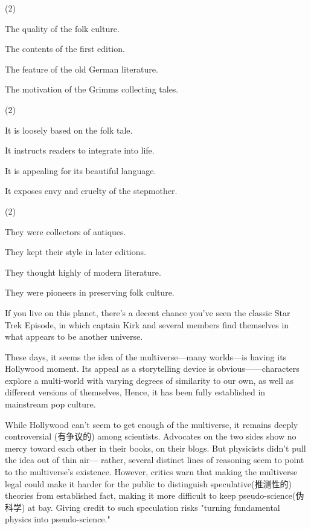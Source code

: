 \documentclass{英语试卷}
\begin{document}
\begin{choices}(2)
  \item The quality of the folk culture.
  \item The contents of the first edition.
  \item The feature of the old German literature.
  \item The motivation of the Grimms collecting tales.
\end{choices}
\begin{choices}(2)
  \item It is loosely based on the folk tale.
  \item It instructs readers to integrate into life.
  \item It is appealing for its beautiful language.
  \item It exposes envy and cruelty of the stepmother.
\end{choices}
\begin{choices}(2)
  \item They were collectors of antiques.
  \item They kept their style in later editions.
  \item They thought highly of modern literature.
  \item They were pioneers in preserving folk culture.
\end{choices}
\par If you live on this planet, there's a decent chance you've seen the classic Star Trek Episode, in which captain Kirk and several members find themselves in what appears to be another universe.\par
\par These days, it seems the idea of the multiverse—many worlds—is having its Hollywood moment. Its appeal as a storytelling device is obvious——characters explore a multi-world with varying degrees of similarity to our own, as well as different versions of themselves, Hence, it has been fully established in mainstream pop culture.\par
\par While Hollywood can't seem to get enough of the multiverse, it remains deeply controversial (有争议的) among scientists. Advocates on the two sides show no mercy toward each other in their books, on their blogs. But physicists didn't pull the idea out of thin air— rather, several distinct lines of reasoning seem to point to the multiverse's existence. However, critics warn that making the multiverse legal could make it harder for the public to distinguish speculative(推测性的) theories from established fact, making it more difficult to keep pseudo-science(伪科学) at bay. Giving credit to such speculation risks "turning fundamental physics into pseudo-science."\par
\end{document}

